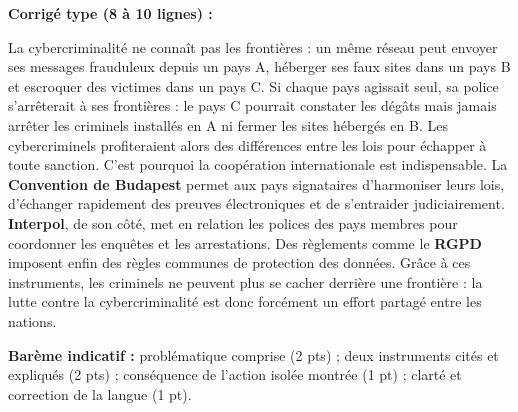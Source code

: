 \documentclass[11pt]{article}
\begin{document}
\begin{corrige}
\textbf{Corrigé type (8 à 10 lignes) :}

La cybercriminalité ne connaît pas les frontières : un même réseau peut envoyer ses messages frauduleux depuis un pays A, héberger ses faux sites dans un pays B et escroquer des victimes dans un pays C. Si chaque pays agissait seul, sa police s'arrêterait à ses frontières : le pays C pourrait constater les dégâts mais jamais arrêter les criminels installés en A ni fermer les sites hébergés en B. Les cybercriminels profiteraient alors des différences entre les lois pour échapper à toute sanction. C'est pourquoi la coopération internationale est indispensable. La \textbf{Convention de Budapest} permet aux pays signataires d'harmoniser leurs lois, d'échanger rapidement des preuves électroniques et de s'entraider judiciairement. \textbf{Interpol}, de son côté, met en relation les polices des pays membres pour coordonner les enquêtes et les arrestations. Des règlements comme le \textbf{RGPD} imposent enfin des règles communes de protection des données. Grâce à ces instruments, les criminels ne peuvent plus se cacher derrière une frontière : la lutte contre la cybercriminalité est donc forcément un effort partagé entre les nations.

\textbf{Barème indicatif :} problématique comprise (2 pts) ; deux instruments cités et expliqués (2 pts) ; conséquence de l'action isolée montrée (1 pt) ; clarté et correction de la langue (1 pt).
\end{corrige}
\end{document}
